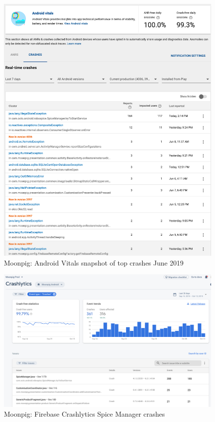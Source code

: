 \begin{figure}
    \centering
    \includegraphics[width=12cm]{images/android-vitals-screenshots/moonpig/real-time-crashes-Screenshot-2019-06-10-at-15.42.34.png}
    \caption{Moonpig: Android Vitals snapshot of top crashes  June 2019}
    \label{fig:av-moonpig-top-real-time-crashes-10-jun-2019}
\end{figure}

\begin{figure}
    \centering
    \includegraphics[width=12cm]{images/moonpig/Firebase-Crashlytics-30D-SpiceManagerCrashes.png}
    \caption{Moonpig: Firebase Crashlytics Spice Manager crashes}
    \label{fig:firebase-crashlytics-moonpig-spicemanager-crashes-30d}
\end{figure}

